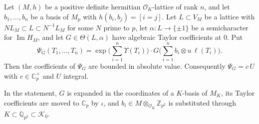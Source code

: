 \begin{theorem}\label{orthint}
Let $(M,h)$ be a positive definite hermitian $\mathcal O_K$-lattice of rank $n$, and let $b_1,\dots,b_n$ be a basis of $M_p$ with $h(b_i,b_j)=[i=j]$. Let $L\subset V_M$ be a lattice with $NL_M\subset L\subset N^{-1}L_M$ for some $N$ prime to $p$, let $\alpha\colon L\to\{\pm1\}$ be a semicharacter for $\operatorname{Im}H_M$, and let $G\in\Theta(L,\alpha)$ have algebraic Taylor coefficients at $0$. Put
\[
\Psi_G(T_1,\dots,T_n)=\exp\Big(\sum_{i=1}^n\Upsilon(T_i)\Big)\cdot G\Big(\sum_{i=1}^nb_i\otimes u\,\ell(T_i)\Big).
\]
Then the coefficients of $\Psi_G$ are bounded in absolute value. Consequently $\Psi_G=c\,U$ with $c\in\mathbb C_p^\times$ and $U$ integral.
\end{theorem}

In the statement, $G$ is expanded in the coordinates of a $K$-basis of $M_K$, its Taylor coefficients are moved to $\mathbb C_p$ by $\iota$, and $b_i\in M\otimes_{\mathcal O_K}\mathbb Z_{p^2}$ is substituted through $K\subset\mathbb Q_{p^2}\subset\mathcal K_0$.

